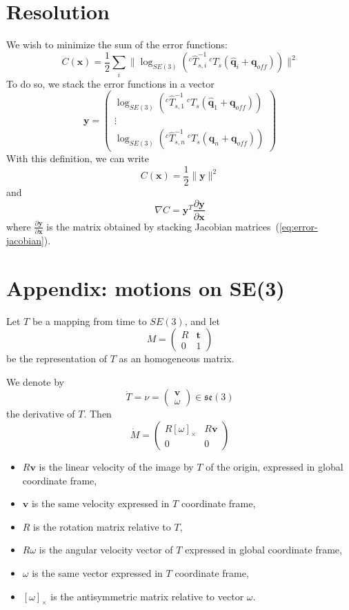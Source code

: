 \documentclass {article}
\newcommand\conf{\mathbf{q}}
\newcommand\confoffset{\mathbf{q}_{off}}
\newcommand\transf{T}
\newcommand\se[1]{\mathfrak{se}(#1)}
\newcommand\transl{\mathbf{t}}
\newcommand\linvel{\mathbf{v}}
\newcommand\angvel{\omega}
\newcommand\cross[1]{\left[#1\right]_{\times}}
\newcommand\x{\mathbf{x}}
\newcommand\y{\mathbf{y}}
\begin{document}
\section {Resolution}

We wish to minimize the sum of the error functions:
$$
C(\x) = \frac{1}{2} \sum_{i} \|\log_{SE(3)}\left(^{c}\hat{\transf}_{s,i}^{-1}\ ^{c}{\transf}_{s} (\hat{\conf}_{i} + \confoffset)\right)\|^2
$$
To do so, we stack the error functions in a vector
$$
\y = \left(\begin{array}{c}
  \log_{SE(3)}\left(^{c}\hat{\transf}_{s,1}^{-1}\ ^{c}{\transf}_{s} (\hat{\conf}_{1} + \confoffset)\right)\\
  \vdots\\
  \log_{SE(3)}\left(^{c}\hat{\transf}_{s,n}^{-1}\ ^{c}{\transf}_{s} (\hat{\conf}_{n} + \confoffset)\right)
\end{array}\right)
$$
With this definition, we can write
$$
C(\x) = \frac{1}{2}\|\y\|^2
$$
and
$$
\nabla{C} = \y^T\frac{\partial\y}{\partial\x}
$$
where $\frac{\partial\y}{\partial\x}$ is the matrix obtained by stacking
Jacobian matrices~(\ref{eq:error-jacobian}).

\section {Appendix: motions on SE(3)}

Let $\transf$ be a mapping from time to $SE(3)$, and let
$$M=\left(\begin{array}{cc}R & \transl \\ 0 & 1\end{array}\right)$$
be the representation of $\transf$ as an homogeneous matrix.

We denote by
\begin{equation}\label{eq:screw}
  \dot{\transf}=\nu=\left(\begin{array}{c}\linvel\\\angvel\end{array}\right)\in \se{3}
\end{equation}
the derivative of $\transf$. Then
$$
\dot{M} = \left(\begin{array}{cc}R\cross{\angvel} & R\linvel\\
  0 & 0\end{array}\right)
$$
\begin{itemize}
\item $R\linvel$ is the linear velocity of the image by $\transf$ of the origin, expressed in global coordinate frame,
\item $\linvel$ is the same velocity expressed in  $\transf$ coordinate frame,
\item $R$ is the rotation matrix relative to $\transf$,
\item $R\angvel$ is the angular velocity vector of $\transf$ expressed in
  global coordinate frame,
\item $\angvel$ is the same vector expressed in $\transf$ coordinate frame,
\item $\cross{\angvel}$ is the antisymmetric matrix relative to vector $\angvel$.
\end{itemize}
\end{document}
